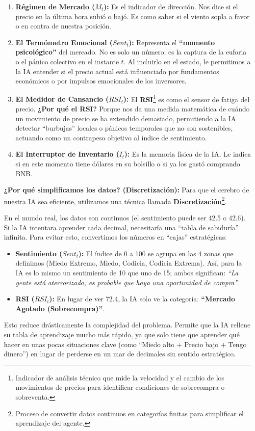 \documentclass[12pt,a4paper]{article}
\begin{document}
\begin{enumerate}
    \item \textbf{Régimen de Mercado ($M_t$):} Es el indicador de dirección. Nos dice si el precio en la última hora subió o bajó. Es como saber si el viento sopla a favor o en contra de nuestra posición.
    \item \textbf{El Termómetro Emocional ($Sent_t$):} Representa el \textbf{``momento psicológico''} del mercado. No es solo un número; es la captura de la euforia o el pánico colectivo en el instante $t$. Al incluirlo en el estado, le permitimos a la IA entender si el precio actual está influenciado por fundamentos económicos o por impulsos emocionales de los inversores.
    \item \textbf{El Medidor de Cansancio ($RSI_t$):} El \textbf{RSI}\footnote{Indicador de análisis técnico que mide la velocidad y el cambio de los movimientos de precios para identificar condiciones de sobrecompra o sobreventa.} es como el sensor de fatiga del precio. \textbf{¿Por qué el RSI?} Porque nos da una medida matemática de cuándo un movimiento de precio se ha extendido demasiado, permitiendo a la IA detectar ``burbujas'' locales o pánicos temporales que no son sostenibles, actuando como un contrapeso objetivo al índice de sentimiento.
    \item \textbf{El Interruptor de Inventario ($I_t$):} Es la memoria física de la IA. Le indica si en este momento tiene dólares en su bolsillo o si ya los gastó comprando BNB. 
\end{enumerate}

\textbf{¿Por qué simplificamos los datos? (Discretización):}
Para que el cerebro de nuestra IA sea eficiente, utilizamos una técnica llamada \textbf{Discretización}\footnote{Proceso de convertir datos continuos en categorías finitas para simplificar el aprendizaje del agente.}. 

En el mundo real, los datos son continuos (el sentimiento puede ser 42.5 o 42.6). Si la IA intentara aprender cada decimal, necesitaría una ``tabla de sabiduría'' infinita. Para evitar esto, convertimos los números en ``cajas'' estratégicas:
\begin{itemize}
    \item \textbf{Sentimiento ($Sent_t$):} El índice de 0 a 100 se agrupa en las 4 zonas que definimos (Miedo Extremo, Miedo, Codicia, Codicia Extrema). Así, para la IA es lo mismo un sentimiento de 10 que uno de 15; ambos significan: \textit{``La gente está aterrorizada, es probable que haya una oportunidad de compra''.}
    \item \textbf{RSI ($RSI_t$):} En lugar de ver 72.4, la IA solo ve la categoría: \textbf{``Mercado Agotado (Sobrecompra)''}.
\end{itemize}
Esto reduce drásticamente la complejidad del problema. Permite que la IA rellene su tabla de aprendizaje mucho más rápido, ya que solo tiene que aprender qué hacer en unas pocas situaciones clave (como ``Miedo alto + Precio bajo + Tengo dinero'') en lugar de perderse en un mar de decimales sin sentido estratégico.
\end{document}
